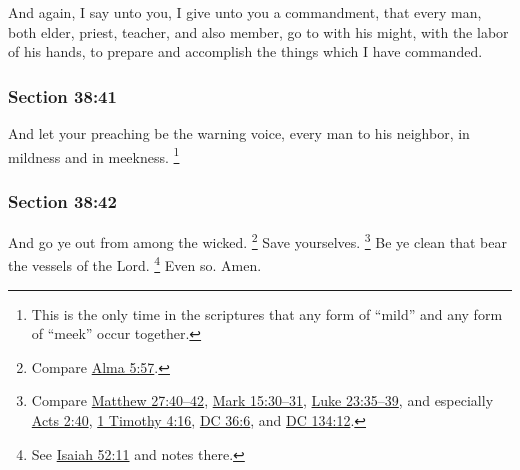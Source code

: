 		And again, I say unto you, I give unto you a commandment, that every man, both elder, priest, teacher, and also member, go to with his might, with the labor of his hands, to prepare and accomplish the things which I have commanded.


	\subsubsection{Section 38:41} %
		\label{DC38-41}

		And let your preaching be the warning voice, every man to his neighbor, in mildness and in meekness.%
			\footnote{%
				This is the only time in the scriptures that any form of ``mild'' and any form of ``meek'' occur together.
				} 


	\subsubsection{Section 38:42} %
		\label{DC38-42}

		And go ye out from among the wicked.%
			\footnote{%
				Compare \hyperref[ALMA-5-57]{Alma 5:57}.
				}
		Save yourselves.%
			\footnote{%
				Compare \hyperref[MATTHEW-27-40]{Matthew 27:40--42}, \hyperref[MARK-15-30]{Mark 15:30--31}, \hyperref[LUKE-23-35]{Luke 23:35--39}, and especially \hyperref[ACTS-2-40]{Acts 2:40}, \hyperref[1TIMOTHY-4-16]{1 Timothy 4:16}, \hyperref[DC36-6]{DC 36:6}, and \hyperref[DC134-12]{DC 134:12}.
				}
		Be ye clean that bear the vessels of the Lord.%
			\footnote{%
				See \hyperref[ISAIAH-52-11]{Isaiah 52:11} and notes there.
				}
		Even so. Amen.


